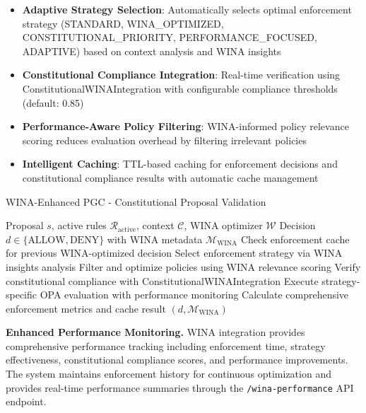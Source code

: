 \documentclass[manuscript,screen,review,anonymous,9pt]{acmart}
\begin{document}
\begin{itemize}
    \item \textbf{Adaptive Strategy Selection}: Automatically selects optimal enforcement strategy (STANDARD, WINA\_OPTIMIZED, CONSTITUTIONAL\_PRIORITY, PERFORMANCE\_FOCUSED, ADAPTIVE) based on context analysis and WINA insights
    \item \textbf{Constitutional Compliance Integration}: Real-time verification using ConstitutionalWINAIntegration with configurable compliance thresholds (default: 0.85) \cite{ConstitutionalCompliance2024}
    \item \textbf{Performance-Aware Policy Filtering}: WINA-informed policy relevance scoring reduces evaluation overhead by filtering irrelevant policies
    \item \textbf{Intelligent Caching}: TTL-based caching for enforcement decisions and constitutional compliance results with automatic cache management \cite{IntelligentCaching2024}
\end{itemize}

\begin{algorithm}[!htbp]
\caption{WINA-Enhanced PGC - Constitutional Proposal Validation}
\label{alg:wina_pgc_validation}
\begin{algorithmic}[1]
\Require Proposal $s$, active rules $\mathcal{R}_{\text{active}}$, context $\mathcal{C}$, WINA optimizer $\mathcal{W}$
\Ensure Decision $d \in \{\text{ALLOW}, \text{DENY}\}$ with WINA metadata $\mathcal{M}_{\text{WINA}}$
  \State Check enforcement cache for previous WINA-optimized decision
  \State Select enforcement strategy via WINA insights analysis
  \State Filter and optimize policies using WINA relevance scoring
  \State Verify constitutional compliance with ConstitutionalWINAIntegration
  \State Execute strategy-specific OPA evaluation with performance monitoring
  \State Calculate comprehensive enforcement metrics and cache result
  \State \Return $(d, \mathcal{M}_{\text{WINA}})$
\EndFunction
\end{algorithmic}
\end{algorithm}

\textbf{Enhanced Performance Monitoring.} WINA integration provides comprehensive performance tracking including enforcement time, strategy effectiveness, constitutional compliance scores, and performance improvements. The system maintains enforcement history for continuous optimization and provides real-time performance summaries through the \texttt{/wina-performance} API endpoint.
\end{document}
